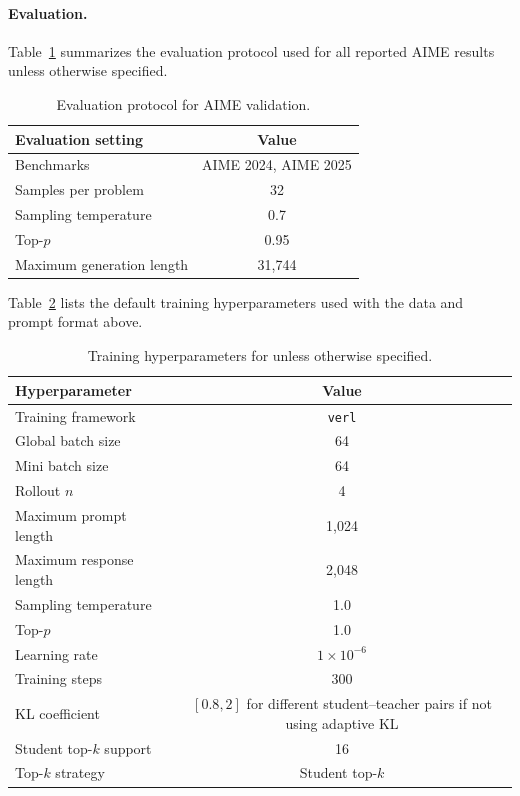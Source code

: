 \paragraph{Evaluation.}
Table~\ref{tab:eval-settings} summarizes the evaluation protocol used for all
reported AIME results unless otherwise specified.

\begin{table}[H]
\centering
\small
\setlength{\tabcolsep}{6pt}
\renewcommand{\arraystretch}{1.08}
\begin{tabular}{lc}
\toprule
Evaluation setting & Value \\
\midrule
Benchmarks & AIME 2024, AIME 2025 \\
Samples per problem & 32 \\
Sampling temperature & 0.7 \\
Top-$p$ & 0.95 \\
Maximum generation length & 31,744 \\
\bottomrule
\end{tabular}
\caption{Evaluation protocol for AIME validation.}
\label{tab:eval-settings}
\end{table}

Table~\ref{tab:dopd-training-hyperparams} lists the default \method{} training
hyperparameters used with the data and prompt format above.

\begin{table}[H]
\centering
\small
\setlength{\tabcolsep}{6pt}
\renewcommand{\arraystretch}{1.08}
\begin{tabular}{lc}
\toprule
Hyperparameter & Value \\
\midrule
Training framework & \texttt{verl} \\
Global batch size & 64 \\
Mini batch size & 64 \\
Rollout $n$ & 4 \\
Maximum prompt length & 1,024 \\
Maximum response length & 2,048 \\
Sampling temperature & 1.0 \\
Top-$p$ & 1.0 \\
Learning rate & $1\times10^{-6}$ \\
Training steps & 300 \\
KL coefficient & $[0.8, 2]$ for different student--teacher pairs if not using adaptive KL \\
Student top-$k$ support & 16 \\
Top-$k$ strategy & Student top-$k$ \\
\bottomrule
\end{tabular}
\caption{Training hyperparameters for \method{} unless otherwise specified.}
\label{tab:dopd-training-hyperparams}
\end{table}

